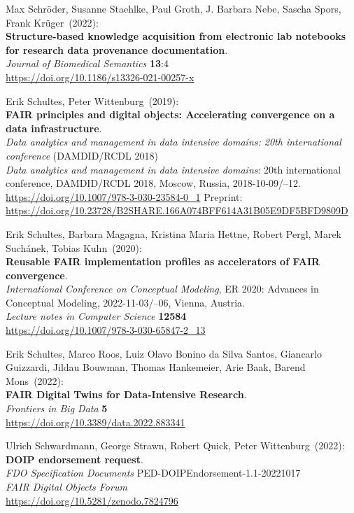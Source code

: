 \begin{thebibliography}{9}
 Max Schröder, Susanne Staehlke, Paul Groth, J.  Barbara Nebe, Sascha Spors, Frank Krüger~(2022): \\
\textbf{Structure-based knowledge acquisition from electronic lab notebooks for research data provenance documentation}.\\
\emph{Journal of Biomedical Semantics} \textbf{13}:4\\
\url{https://doi.org/10.1186/s13326-021-00257-x}

Erik Schultes, Peter Wittenburg~(2019): \\
\textbf{FAIR principles and digital objects: Accelerating convergence on a data infrastructure}.\\
\emph{Data analytics and management in data intensive domains: 20th international conference} (DAMDID/RCDL 2018)\\
\emph{Data analytics and management in data intensive domains}: 20th international conference,
{DAMDID}/{RCDL} 2018, Moscow, Russia, 2018-10-09/--12. \\
\url{https://doi.org/10.1007/978-3-030-23584-0_1}
Preprint: \url{https://doi.org/10.23728/B2SHARE.166A074BFF614A31B05E9DF5BFD9809D}

Erik Schultes, Barbara Magagna, Kristina Maria Hettne, Robert Pergl, Marek Suchánek, Tobias Kuhn~(2020): \\
\textbf{Reusable {FAIR} implementation profiles as accelerators of {FAIR} convergence}.\\
\emph{International Conference on Conceptual Modeling}, ER 2020: Advances in Conceptual Modeling, 2022-11-03/--06, Vienna, Austria. \\
\emph{Lecture notes in Computer Science} \textbf{12584} \\ 
\url{https://doi.org/10.1007/978-3-030-65847-2_13}

Erik Schultes, Marco Roos, Luiz Olavo Bonino da Silva Santos, Giancarlo Guizzardi, Jildau Bouwman, Thomas Hankemeier, Arie Baak, Barend Mons~(2022): \\
\textbf{FAIR Digital Twins for Data-Intensive Research}.\\
\emph{Frontiers in Big Data} \textbf{5}\\
\url{https://doi.org/10.3389/data.2022.883341}

Ulrich Schwardmann, George Strawn, Robert Quick, Peter Wittenburg~(2022): \\
\textbf{DOIP endorsement request}.\\
\emph{FDO Specification Documents} PED-DOIPEndorsement-1.1-20221017\\
\emph{FAIR Digital Objects Forum}\\
\url{https://doi.org/10.5281/zenodo.7824796}


\end{thebibliography}
